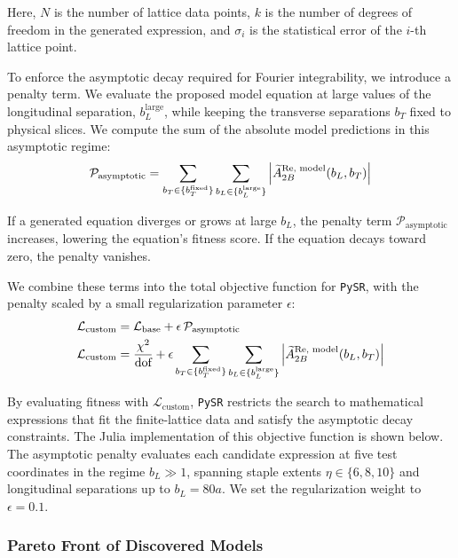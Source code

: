 Here, $N$ is the number of lattice data points, $k$ is the number of degrees of freedom in the generated expression, and $\sigma_i$ is the statistical error of the $i$-th lattice point.

To enforce the asymptotic decay required for Fourier integrability, we introduce a penalty term. We evaluate the proposed model equation at large values of the longitudinal separation, $b_L^{\text{large}}$, while keeping the transverse separations $b_T$ fixed to physical slices. We compute the sum of the absolute model predictions in this asymptotic regime:
\begin{align}
    \mathcal{P}_{\text{asymptotic}} = \sum_{b_T \in \{b_{T}^{\text{fixed}}\}} \sum_{b_L \in \{b_{L}^{\text{large}}\}} \left| \widetilde{A}_{2B}^{\text{Re, model}}(b_L, b_T) \right|
\end{align}

If a generated equation diverges or grows at large $b_L$, the penalty term $\mathcal{P}_{\text{asymptotic}}$ increases, lowering the equation's fitness score. If the equation decays toward zero, the penalty vanishes.

We combine these terms into the total objective function for \texttt{PySR}, with the penalty scaled by a small regularization parameter $\epsilon$:
\begin{align}
    \mathcal{L}_{\text{custom}} &= \mathcal{L}_{\text{base}} + \epsilon \, \mathcal{P}_{\text{asymptotic}} \\
    \mathcal{L}_{\text{custom}} &= \frac{\chi^2}{\text{dof}} + \epsilon \sum_{b_T \in \{b_{T}^{\text{fixed}}\}} \sum_{b_L \in \{b_{L}^{\text{large}}\}} \left| \widetilde{A}_{2B}^{\text{Re, model}}(b_L, b_T) \right|
\end{align}

By evaluating fitness with $\mathcal{L}_{\text{custom}}$, \texttt{PySR} restricts the search to mathematical expressions that fit the finite-lattice data and satisfy the asymptotic decay constraints. The Julia implementation of this objective function is shown below. The asymptotic penalty evaluates each candidate expression at five test coordinates in the regime $b_L \gg 1$, spanning staple extents $\eta \in \{6, 8, 10\}$ and longitudinal separations up to $b_L = 80a$. We set the regularization weight to $\epsilon = 0.1$.



\subsubsection{Pareto Front of Discovered Models}
\label{sec:pysr_pareto}

